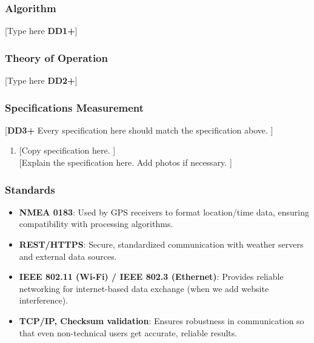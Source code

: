 \subsubsection{Algorithm}
[Type here \textbf{DD1+}]

\subsubsection{Theory of Operation}
[Type here \textbf{DD2+}]

\subsubsection{Specifications Measurement}
[\textbf{DD3+} Every specification here should match the specification above. ]
\begin{enumerate}
    \item {[Copy specification here. ]} \\
          {[Explain the specification here. Add photos if necessary. ]}
\end{enumerate}

\subsubsection{Standards}
\begin{itemize}
    \item \textbf{NMEA 0183}: Used by GPS receivers to format location/time data, ensuring compatibility with processing algorithms.
    \item \textbf{REST/HTTPS}: Secure, standardized communication with weather servers and external data sources.
    \item \textbf{IEEE 802.11 (Wi-Fi) / IEEE 802.3 (Ethernet)}: Provides reliable networking for internet-based data exchange (when we add website interference).
    \item \textbf{TCP/IP, Checksum validation}: Ensures robustness in communication so that even non-technical users get accurate, reliable results.
\end{itemize}